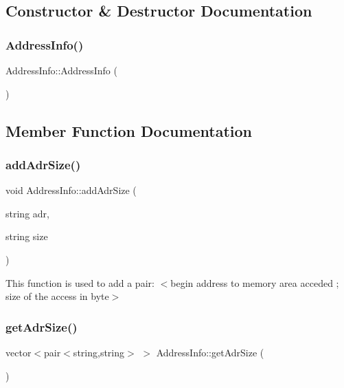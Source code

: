 \subsection{Constructor \& Destructor Documentation}
\mbox{\label{classAddressInfo_a1d82e681b86d769de4325b99163ed640}} 
\subsubsection{\texorpdfstring{Address\+Info()}{AddressInfo()}}
{\footnotesize\ttfamily Address\+Info\+::\+Address\+Info (\begin{DoxyParamCaption}{ }\end{DoxyParamCaption})}



\subsection{Member Function Documentation}
\mbox{\label{classAddressInfo_a90a057789302f68c43f07ffaafb53af1}} 
\subsubsection{\texorpdfstring{add\+Adr\+Size()}{addAdrSize()}}
{\footnotesize\ttfamily void Address\+Info\+::add\+Adr\+Size (\begin{DoxyParamCaption}\item[{string}]{adr,  }\item[{string}]{size }\end{DoxyParamCaption})}

This function is used to add a pair\+: $<$begin address to memory area acceded ; size of the access in byte$>$ \mbox{\label{classAddressInfo_a459c495a6d820e9312d733a816a3ba79}} 
\subsubsection{\texorpdfstring{get\+Adr\+Size()}{getAdrSize()}}
{\footnotesize\ttfamily vector$<$pair$<$string,string$>$ $>$ Address\+Info\+::get\+Adr\+Size (\begin{DoxyParamCaption}{ }\end{DoxyParamCaption})}

